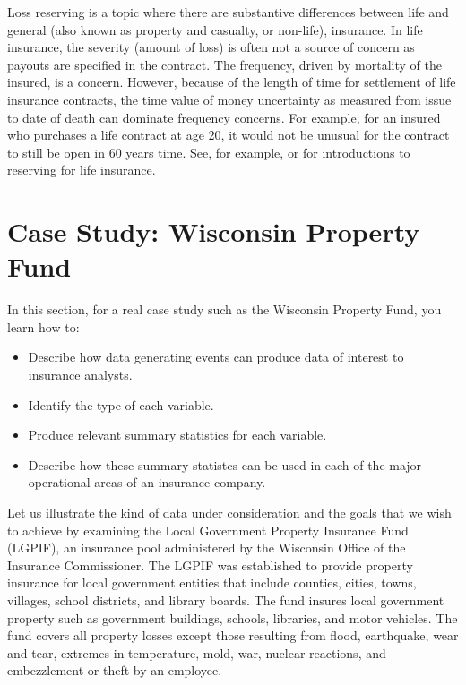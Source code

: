 \documentclass[]{book}
\providecommand{\tightlist}{%
  \setlength{\itemsep}{0pt}\setlength{\parskip}{0pt}}
\theoremstyle{definition}
\theoremstyle{definition}
\theoremstyle{definition}
\theoremstyle{remark}
\begin{document}
Loss reserving is a topic where there are substantive differences
between life and general (also known as property and casualty, or
non-life), insurance. In life insurance, the severity (amount of loss)
is often not a source of concern as payouts are specified in the
contract. The frequency, driven by mortality of the insured, is a
concern. However, because of the length of time for settlement of life
insurance contracts, the time value of money uncertainty as measured
from issue to date of death can dominate frequency concerns. For
example, for an insured who purchases a life contract at age 20, it
would not be unusual for the contract to still be open in 60 years time.
See, for example, \citep{bowers1986actuarial} or
\citep{dickson2013actuarial} for introductions to reserving for life
insurance.

\section{Case Study: Wisconsin Property Fund}\label{sec:LGPIF}

In this section, for a real case study such as the Wisconsin Property
Fund, you learn how to:

\begin{itemize}
\tightlist
\item
  Describe how data generating events can produce data of interest to
  insurance analysts.
\item
  Identify the type of each variable.
\item
  Produce relevant summary statistics for each variable.
\item
  Describe how these summary statistcs can be used in each of the major
  operational areas of an insurance company.
\end{itemize}

Let us illustrate the kind of data under consideration and the goals
that we wish to achieve by examining the Local Government Property
Insurance Fund (LGPIF), an insurance pool administered by the Wisconsin
Office of the Insurance Commissioner. The LGPIF was established to
provide property insurance for local government entities that include
counties, cities, towns, villages, school districts, and library boards.
The fund insures local government property such as government buildings,
schools, libraries, and motor vehicles. The fund covers all property
losses except those resulting from flood, earthquake, wear and tear,
extremes in temperature, mold, war, nuclear reactions, and embezzlement
or theft by an employee.
\end{document}
